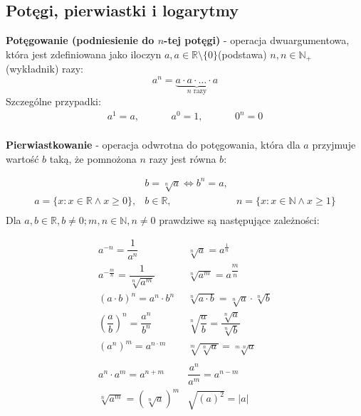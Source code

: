\documentclass[14pt,a4paper]{extarticle}
\begin{document}
\subsection{Potęgi, pierwiastki i logarytmy}
\textbf{Potęgowanie (podniesienie do $n$-tej potęgi)} - operacja dwuargumentowa, która jest zdefiniowana jako iloczyn $a, a \in \mathbb{R}\setminus\{0\}$(podstawa) $n, n \in \mathbb{N}_{+}$(wykładnik) razy:\
$$a^{n} = \underbrace{a\cdot a \cdot\ldots\cdot a}_{n\text{ razy}}$$
Szczególne przypadki:
\begin{equation*}
\begin{array}{ccc}
   a^{1} = a, &\hspace{1cm} a^{0} = 1, &\hspace{1cm} 0^{n} = 0 \\ 
\end{array}
\end{equation*}

\renewcommand{\arraycolsep}{0cm}
\renewcommand{\arraystretch}{2}


\noindent\textbf{Pierwiastkowanie} - operacja odwrotna do potęgowania, która dla $a$ przyjmuje wartość $b$ taką, że pomnożona $n$ razy jest równa $b$:

\begin{equation*}
\begin{array}{ccc}
    & b = \sqrt[n]{a} \Leftrightarrow b^{n} = a, & \\
   a=\{x:x\in\mathbb{R}\land x\geq 0\}, & b\in\mathbb{R}, & n=\{x:x\in\mathbb{N}\land x\geq 1\} \\
\end{array}
\end{equation*}
\noindent Dla $a,b \in \mathbb{R}, b \neq 0; m,n \in \mathbb{N}, n \neq 0 $ prawdziwe są następujące zależności:

\renewcommand{\arraycolsep}{1cm}
\renewcommand{\arraystretch}{2}

\begin{equation*}
\begin{array}{ll}
   a^{-n} = \dfrac{1}{a^{n}} & \sqrt[n]{a} = a^{\frac{1}{n}} \\
   a^{-\frac{m}{n}} = \dfrac{\displaystyle 1}{ \sqrt[n]{\displaystyle a^{m}}} & \sqrt[n]{a^{m}} = a^{\dfrac{m}{n}}\\
   (a\cdot b)^{n} = a^{n}\cdot b^{n} & \sqrt[n]{a\cdot b} = \sqrt[n]{a} \cdot \sqrt[n]{b} \\
   \left(\dfrac{a}{b}\right)^{n} = \dfrac{a^{n}}{b^{n}} & \sqrt[n]{\dfrac{a}{b}} = \dfrac{\sqrt[n]{a}}{\sqrt[n]{b}} \\
   (a^{n})^{m} = a^{n\cdot m} & \sqrt[m]{\sqrt[n]{a}} = \sqrt[m\cdot n]{a}\\
   \\
   a^{n}\cdot a^{m} = a^{n+m} & \dfrac{a^{n}}{a^{m}} = a^{n - m} \\
   \sqrt[n]{a^{m}} = (\sqrt[n]{a})^{m} &  \sqrt{(a)^{2}} = \lvert a\rvert \\
\end{array}
\end{equation*}
\\
\end{document}
